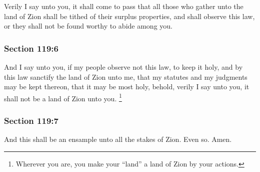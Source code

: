 		Verily I say unto you, it shall come to pass that all those who gather unto the land of Zion shall be tithed of their surplus properties, and shall observe this law, or they shall not be found worthy to abide among you.


	\subsubsection{Section 119:6} %
		\label{DC119-6}

		And I say unto you, if my people observe not this law, to keep it holy, and by this law sanctify the land of Zion unto me, that my statutes and my judgments may be kept thereon, that it may be most holy, behold, verily I say unto you, it shall not be a land of Zion unto you.%
			\footnote{%
				Wherever you are, you make your ``land'' a land of Zion by your actions.
				}


	\subsubsection{Section 119:7} %
		\label{DC119-7}

		And this shall be an ensample unto all the stakes of Zion.  Even so.  Amen.

